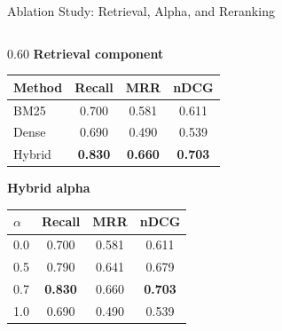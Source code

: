 \documentclass[10pt,aspectratio=169]{beamer}
\begin{document}
\begin{frame}{Ablation Study: Retrieval, Alpha, and Reranking}
    \begin{columns}[T,totalwidth=\textwidth]
        \begin{column}{0.60\textwidth}
            \scriptsize
            \textbf{Retrieval component}
            \begin{tabular}{lccc}
                \toprule
                Method & Recall & MRR & nDCG \\
                \midrule
                BM25 & 0.700 & 0.581 & 0.611 \\
                Dense & 0.690 & 0.490 & 0.539 \\
                Hybrid & \textbf{0.830} & \textbf{0.660} & \textbf{0.703} \\
                \bottomrule
            \end{tabular}

            \vspace{0.6em}
            \textbf{Hybrid alpha}
            \begin{tabular}{lccc}
                \toprule
                $\alpha$ & Recall & MRR & nDCG \\
                \midrule
                0.0 & 0.700 & 0.581 & 0.611 \\
                0.5 & 0.790 & 0.641 & 0.679 \\
                0.7 & \textbf{0.830} & 0.660 & \textbf{0.703} \\
                1.0 & 0.690 & 0.490 & 0.539 \\
                \bottomrule
            \end{tabular}


\end{column}
\end{columns}
\end{frame}
\end{document}
